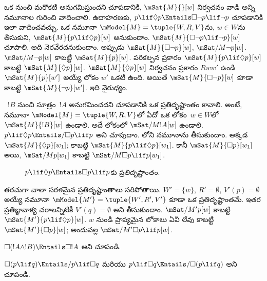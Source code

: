 \documentclass[../../../include/open-logic-section]{subfiles}
\begin{document}
\begin{ex}
  ఒక  నుంచి మరొకటి
  అనుగమిస్తుందని చూపడానికి, $\mSat{M}{}[w]$ నిర్వచనం
  వాడి అన్ని నమూనాల గురించి వాదించాలి. ఉదాహరణకు,
  $p \lif \Diamond p \Entails \Box\lnot p \lif \lnot p$
  చూపడానికి ఇలా వాదించవచ్చు. ఒక నమూనా
  $\mModel{M} = \tuple{W, R, V}$ను, $w \in W$ను తీసుకుని,
  $\mSat{M}{p \lif \Diamond p}[w]$ అనుకుందాం.
  $\mSat{M}{\Box\lnot p \lif \lnot p}[w]$ చూపాలి.
  అది నెరవేరదనుకుందాం. అప్పుడు $\mSat{M}{\Box\lnot p}[w]$,
  $\mSat/{M}{\lnot p}[w]$. $\mSat/{M}{\lnot p}[w]$
  కాబట్టి $\mSat{M}{p}[w]$. పరికల్పన ప్రకారం
  $\mSat{M}{p \lif \Diamond p}[w]$ కాబట్టి
  $\mSat{M}{\Diamond p}[w]$. $\mSat{M}{\Diamond p}[w]$
  నిర్వచనం ప్రకారం $Rww'$ ఉండి $\mSat{M}{p}[w']$
  అయ్యే లోకం $w'$ ఒకటి ఉంది. అయితే
  $\mSat{M}{\Box \lnot p}[w]$ కూడా కాబట్టి
  $\mSat{M}{\lnot p}[w']$. ఇది వైరుధ్యం.

  ~$!B$ నుంచి సూత్రం~$!A$
  అనుగమించదని చూపడానికి ఒక ప్రతిదృష్టాంతం కావాలి.
  అంటే, నమూనా $\mModel{M} = \tuple{W, R, V}$లో
  ఏదో ఒక లోకం~$w \in W$లో $\mSat{M}{!B}[w]$ ఉండాలి.
  అదే లోకంలో $\mSat/{M}{!A}[w]$ ఉండాలి.
  $p \lif \Diamond p \Entails/
  \Box p \lif p$ అని చూపుదాం.
  లోని నమూనాను తీసుకుందాం.
  అక్కడ $\mSat{M}{\Diamond p}[w_1]$;
  కాబట్టి $\mSat{M}{p \lif
    \Diamond p}[w_1]$. కానీ $\mSat{M}{\Box p}[w_1]$
  అయి, $\mSat/{M}{p}[w_1]$ కాబట్టి
  $\mSat/{M}{\Box p \lif p}[w_1]$.
  \begin{figure}
  \begin{center}
  \end{center}
  \caption{$p \lif \Diamond p
  \Entails \Box p \lif p$కు ప్రతిదృష్టాంతం.}
  \end{figure}

  తరచుగా చాలా సరళమైన ప్రతిదృష్టాంతాలు సరిపోతాయి.
  $W' = \{w\}$, $R' = \emptyset$, $V'(p) =
  \emptyset$ అయ్యే నమూనా $\mModel{M'} =
  \tuple{W', R', V'}$ కూడా ఒక ప్రతిదృష్టాంతమే.
  ఇతర ప్రతిజ్ఞావాక్య చరాలన్నిటికీ $V'(q)=\emptyset$
  అని తీసుకుందాం.
  $\mSat/{M'}{p}[w]$ కాబట్టి
  $\mSat{M'}{p \lif \Diamond p}[w]$.
  $w$ నుండి ప్రాప్యమైన లోకాలు ఏవీ లేవు కాబట్టి
  $\mSat{M'}{\Box p}[w]$; అందువల్ల
  $\mSat/{M'}{\Box p
    \lif p}[w]$.
\end{ex}

\begin{prob}
  $\Box (!A \land !B) \Entails \Box !A$ అని చూపండి.
\end{prob}

\begin{prob}
  $\Box (p \lif q) \Entails/ p \lif \Box q$ మరియు
  $p \lif \Box q \Entails/\Box (p \lif q)$ అని చూపండి.
\end{prob}
\end{document}
